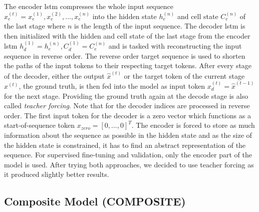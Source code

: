 The encoder \gls{lstm} compresses the whole input sequence $x_e^{(t)} = x_e^{(1)}, x_e^{(2)}, ..., x_e^{(n)}$ into the hidden state $h_e^{(n)}$ and cell state $C_e^{(n)}$ of the last stage where $n$ is the length of the input sequence. The decoder \gls{lstm} is then initialized with the hidden and cell state of the last stage from the encoder \gls{lstm} $h_d^{(1)} = h_e^{(n)}, C_d^{(1)} = C_e^{(n)}$ and is tasked with reconstructing the input sequence in reverse order. The reverse order target sequence is used to shorten the paths of the input tokens to their respecting target tokens. After every stage of the decoder, either the output $\hat{x}^{(t)}$ or the target token of the current stage $x^{(t)}$, the ground truth, is then fed into the model as input token $x_d^{(t)} = \hat{x}^{(t-1)}$ for the next stage. Providing the ground truth again at the decode stage is also called \textit{teacher forcing}. Note that for the decoder indices are processed in reverse order. The first input token for the decoder is a zero vector which functions as a start-of-sequence token $x_{zero} = [0, ..., 0]^T$. The encoder is forced to store as much information about the sequence as possible in the hidden state and as the size of the hidden state is constrained, it has to find an abstract representation of the sequence. For supervised fine-tuning and validation, only the encoder part of the model is used. After trying both approaches, we decided to use teacher forcing as it produced slightly better results.

\FloatBarrier

\subsection{Composite Model (COMPOSITE)} \label{sec:experiments:lstm:composite}

